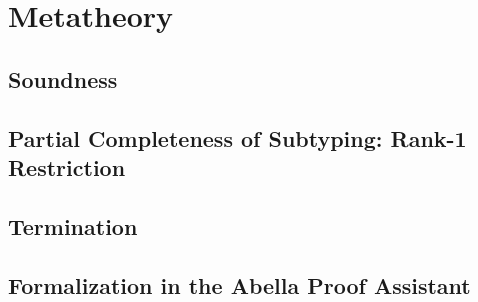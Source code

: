 \section{Metatheory}

\subsection{Soundness}

\subsection{Partial Completeness of Subtyping: Rank-1 Restriction}

\subsection{Termination}

\subsection{Formalization in the Abella Proof Assistant}

